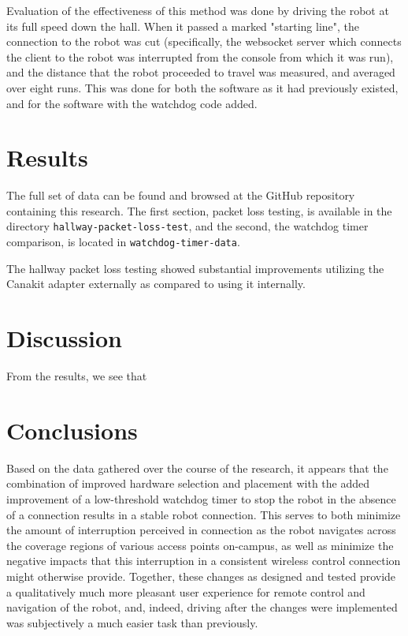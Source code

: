 \documentclass{IEEEtran}
\begin{document}
Evaluation of the effectiveness of this method was done by driving the robot
at its full speed down the hall. When it passed a marked "starting line",
the connection to the robot was cut (specifically, the websocket server which
connects the client to the robot was interrupted from the console from which
it was run), and the distance that the robot proceeded to travel was measured, 
and averaged over eight runs. This was done for both the software as it had
previously existed, and for the software with the watchdog code added.

\section{Results}
The full set of data can be found and browsed at the GitHub repository
containing this research\cite{uropgithub}. The first section, packet loss
testing, is available in the directory \texttt{hallway-packet-loss-test},
and the second, the watchdog timer comparison, is located in 
\texttt{watchdog-timer-data}.

The hallway packet loss testing showed substantial improvements utilizing the
Canakit adapter externally as compared to using it internally. 


\section{Discussion}
From the results, we see that 


\section{Conclusions}
Based on the data gathered over the course of the research, it appears that
the combination of improved hardware selection and placement with the added
improvement of a low-threshold watchdog timer to stop the robot in the absence
of a connection results in a stable robot connection. This serves to both
minimize the amount of interruption perceived in connection as the robot
navigates across the coverage regions of various access points on-campus, as
well as minimize the negative impacts that this interruption in a consistent
wireless control connection might otherwise provide. Together, these changes
as designed and tested provide a qualitatively much more pleasant user
experience for remote control and navigation of the robot, and, indeed,
driving after the changes were implemented was subjectively a much easier task
than previously.
\end{document}
